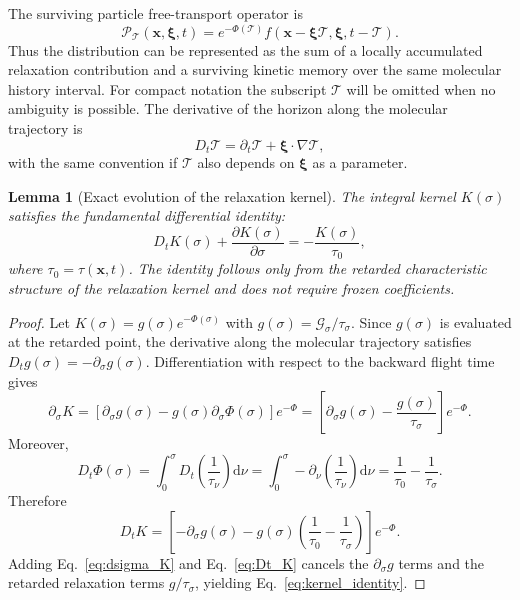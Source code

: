 \documentclass[preprint,12pt]{elsarticle}
\newtheorem{lemma}{Lemma}
\begin{document}
The surviving particle free-transport operator is
\begin{equation}\label{eq:P_def}
    \mathcal{P}_\mathcal{T}(\boldsymbol{x},\boldsymbol{\xi},t)
    =
    e^{-\Phi(\mathcal{T})}f(\boldsymbol{x}-\boldsymbol{\xi} \mathcal{T},\boldsymbol{\xi},t-\mathcal{T}).
\end{equation}
Thus the distribution can be represented as the sum of a locally accumulated relaxation contribution and a surviving kinetic memory over the same molecular history interval. For compact notation the subscript $\mathcal{T}$ will be omitted when no ambiguity is possible. The derivative of the horizon along the molecular trajectory is
\begin{equation}\label{eq:DT_def}
    D_t \mathcal{T}=\partial_t \mathcal{T}+\boldsymbol{\xi}\cdot\nabla \mathcal{T} ,
\end{equation}
with the same convention if $\mathcal{T}$ also depends on $\boldsymbol{\xi}$ as a parameter.

\begin{lemma}[Exact evolution of the relaxation kernel]\label{lem:kernel}
The integral kernel $K(\sigma)$ satisfies the fundamental differential identity:
\begin{equation}\label{eq:kernel_identity}
    D_t K(\sigma) + \frac{\partial K(\sigma)}{\partial\sigma} = -\frac{K(\sigma)}{\tau_0},
\end{equation}
where $\tau_0=\tau(\boldsymbol{x},t)$. The identity follows only from the retarded characteristic structure of the relaxation kernel and does not require frozen coefficients.
\end{lemma}

\begin{proof}
Let $K(\sigma)=g(\sigma)e^{-\Phi(\sigma)}$ with $g(\sigma)=\mathcal{G}_\sigma/\tau_\sigma$. Since $g(\sigma)$ is evaluated at the retarded point, the derivative along the molecular trajectory satisfies $D_t g(\sigma)=-\partial_\sigma g(\sigma)$. Differentiation with respect to the backward flight time gives
\begin{equation}\label{eq:dsigma_K}
    \partial_\sigma K = \left[ \partial_\sigma g(\sigma) - g(\sigma)\partial_\sigma \Phi(\sigma) \right] e^{-\Phi}
    = \left[ \partial_\sigma g(\sigma) - \frac{g(\sigma)}{\tau_\sigma} \right] e^{-\Phi}.
\end{equation}
Moreover,
\begin{equation}
    D_t\Phi(\sigma) = \int_0^\sigma D_t \left( \frac{1}{\tau_\nu} \right) \mathrm{d}\nu = \int_0^\sigma -\partial_\nu \left( \frac{1}{\tau_\nu} \right) \mathrm{d}\nu = \frac{1}{\tau_0} - \frac{1}{\tau_\sigma}.
\end{equation}
Therefore
\begin{equation}\label{eq:Dt_K}
    D_t K = \left[ -\partial_\sigma g(\sigma) - g(\sigma)\left(\frac{1}{\tau_0} - \frac{1}{\tau_\sigma}\right) \right] e^{-\Phi}.
\end{equation}
Adding Eq.~\eqref{eq:dsigma_K} and Eq.~\eqref{eq:Dt_K} cancels the $\partial_\sigma g$ terms and the retarded relaxation terms $g/\tau_\sigma$, yielding Eq.~\eqref{eq:kernel_identity}.
\end{proof}
\end{document}
